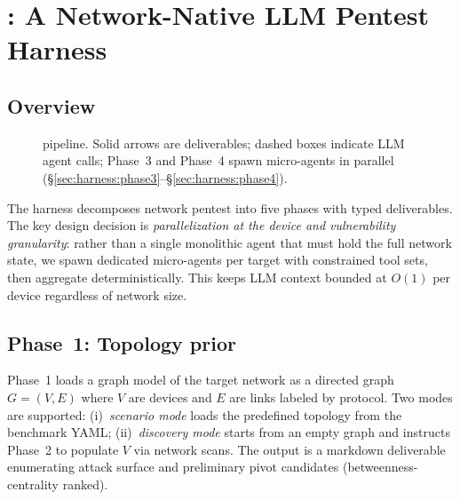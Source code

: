 
\section{\harnessname: A Network-Native LLM Pentest Harness}
\label{sec:harness}

\subsection{Overview}
\label{sec:harness:overview}

\begin{figure}[t]
  \centering
  \caption{\harnessname{} pipeline. Solid arrows are deliverables; dashed boxes
  indicate LLM agent calls; Phase~3 and Phase~4 spawn micro-agents in parallel
  (§\ref{sec:harness:phase3}--§\ref{sec:harness:phase4}).}
  \label{fig:pipeline}
\end{figure}

The harness decomposes network pentest into five phases with typed deliverables.
The key design decision is \emph{parallelization at the device and
vulnerability granularity}: rather than a single monolithic agent that must hold
the full network state, we spawn dedicated micro-agents per target with
constrained tool sets, then aggregate deterministically. This keeps LLM context
bounded at $O(1)$ per device regardless of network size.

\subsection{Phase~1: Topology prior}
\label{sec:harness:phase1}

Phase~1 loads a graph model of the target network as a directed graph
$G=(V,E)$ where $V$ are devices and $E$ are links labeled by protocol. Two
modes are supported: (i)~\emph{scenario mode} loads the predefined topology
from the benchmark YAML; (ii)~\emph{discovery mode} starts from an empty graph
and instructs Phase~2 to populate $V$ via network scans. The output is a
markdown deliverable enumerating attack surface and preliminary pivot candidates
(betweenness-centrality ranked).

